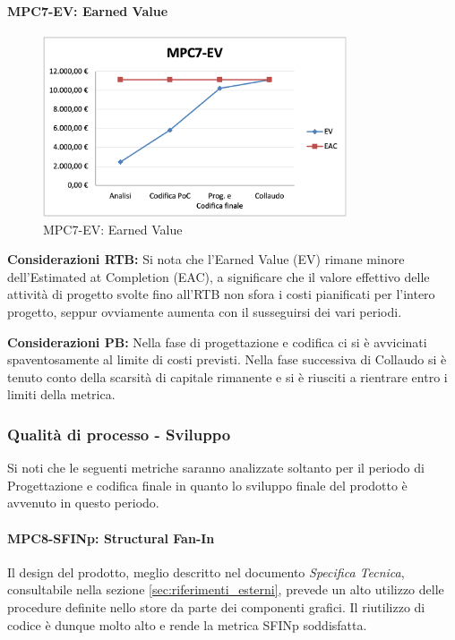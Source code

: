 \paragraph{MPC7-EV: Earned Value}
\begin{figure}[h!] 
    \centering
    \includegraphics[width=0.8\textwidth]{images/MPC7-EV.png}
    \caption{MPC7-EV: Earned Value}
\end{figure}
\noindent \textbf{Considerazioni RTB:} Si nota che l'Earned Value (EV) rimane minore dell'Estimated at Completion (EAC), a significare che il valore effettivo delle attività di progetto svolte fino all'RTB non sfora i costi pianificati per l'intero progetto, seppur ovviamente aumenta con il susseguirsi dei vari periodi.

\vspace{0.5cm}
\noindent \textbf{Considerazioni PB:} Nella fase di progettazione e codifica ci si è avvicinati spaventosamente al limite di costi previsti. Nella fase successiva di Collaudo si è tenuto conto della scarsità di capitale rimanente e si è riusciti a rientrare entro i limiti della metrica.

\subsubsection{Qualità di processo - Sviluppo} \label{sec:sviluppo}
Si noti che le seguenti metriche saranno analizzate soltanto per il periodo di Progettazione e codifica finale in quanto lo sviluppo finale del prodotto è avvenuto in questo periodo.

\paragraph{MPC8-SFINp: Structural Fan-In}  
Il design del prodotto, meglio descritto nel documento \textit{Specifica Tecnica}, consultabile nella sezione \ref{sec:riferimenti_esterni}, prevede un alto utilizzo delle procedure definite nello store da parte dei componenti grafici. Il riutilizzo di codice è dunque molto alto e rende la metrica SFINp soddisfatta.

